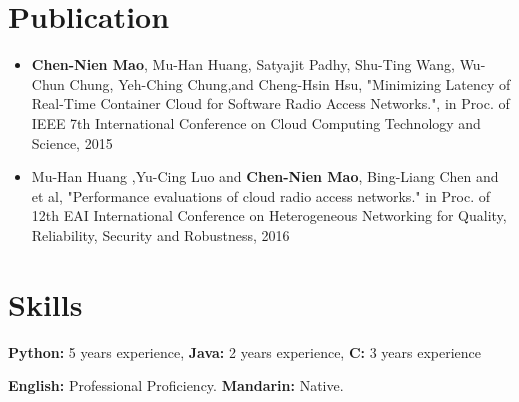 \documentclass{article}
\begin{document}
\section{Publication}
\begin{itemize}
\item  \textbf{Chen-Nien Mao}, Mu-Han Huang, Satyajit Padhy, Shu-Ting Wang, Wu-Chun Chung, Yeh-Ching Chung,and Cheng-Hsin Hsu, "Minimizing Latency of Real-Time Container Cloud for Software Radio Access Networks.", in Proc. of IEEE 7th International Conference on Cloud Computing Technology and Science,
2015  
\item Mu-Han Huang ,Yu-Cing Luo and \textbf{Chen-Nien Mao}, Bing-Liang Chen and et al, "Performance evaluations of cloud radio access networks." in Proc. of 12th EAI International Conference on Heterogeneous Networking for Quality, Reliability, Security and Robustness, 2016
\end{itemize}

\section{Skills}
\begin{description}[widest=Langauges]
\item[Technical Skills:]
\textbf{Python:} 5 years experience,
\textbf{Java:} 2 years experience,
\textbf{C:} 3 years experience
\item[Languages:] \textbf{English:} Professional Proficiency. \textbf{Mandarin:} Native.
\end{description}
\end{document}

